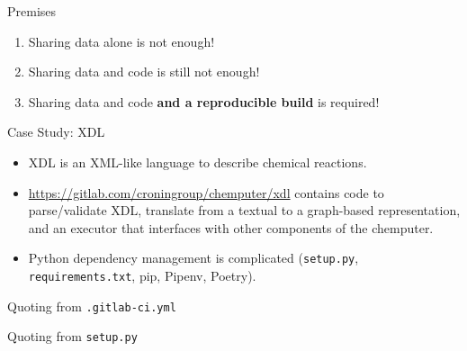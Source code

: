 \documentclass[xcolor={table,usenames,dvipsnames},aspectratio=169]{beamer}
\begin{document}
\begin{frame}{Premises}
  \begin{enumerate}
    \item<1-> Sharing data alone is not enough!
    \item<2-> Sharing data and code is still not enough!
    \item<3-> Sharing data and code \textbf{and a reproducible build} is required!
  \end{enumerate}
\end{frame}

\begin{frame}[allowframebreaks]{Case Study: XDL}

\begin{itemize}
\item{XDL is an XML-like language to describe chemical reactions.}
\item{\url{https://gitlab.com/croningroup/chemputer/xdl}
contains code to parse/validate XDL, translate from a textual to a graph-based
representation, and an executor that interfaces with other components of the
chemputer.
}
\item{Python dependency management is complicated
(\texttt{setup.py}, \texttt{requirements.txt}, pip, Pipenv, Poetry).}
\end{itemize}

\framebreak

Quoting from \texttt{.gitlab-ci.yml}


Quoting from \texttt{setup.py}

\end{frame}
\end{document}
